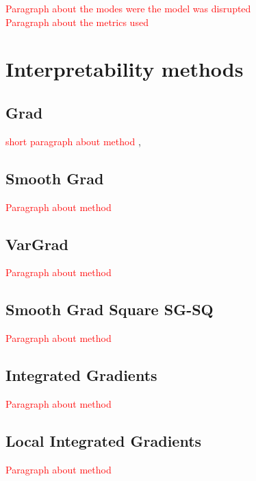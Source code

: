 \documentclass[12pt]{report}
\begin{document}
\textcolor{red}{Paragraph about the modes were the model was disrupted} \\

\textcolor{red}{Paragraph about the metrics used} \\





\newpage
\section{Interpretability methods}








\subsection{Grad }
	\textcolor{red}{short paragraph about method} \cite{baehrens2010explain}, \cite{https://doi.org/10.48550/arxiv.1312.6034}

\subsection{Smooth Grad}

	\textcolor{red}{Paragraph about method} \cite{DBLP:journals/corr/SmilkovTKVW17}

\subsection{VarGrad}

	\textcolor{red}{Paragraph about method} \ \cite{DBLP:journals/corr/abs-1810-03307}

\subsection{Smooth Grad Square SG-SQ}
		\textcolor{red}{Paragraph about method} \cite{https://doi.org/10.48550/arxiv.1806.10758}

\subsection{Integrated Gradients}

		\textcolor{red}{Paragraph about method} \cite{DBLP:journals/corr/SundararajanTY17}

\subsection{Local Integrated Gradients}
		\textcolor{red}{Paragraph about method} \cite{https://doi.org/10.48550/arxiv.1711.06104}
\end{document}
